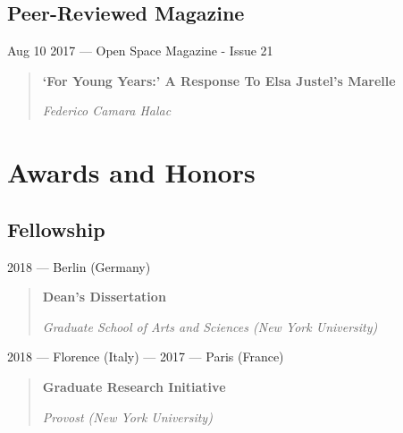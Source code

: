 \documentclass[12pt,overlapped]{res}%
\begin{document}
\begin{resume}
\begin{quote}
\end{quote}%
%
%
%

%
%
%
\subsection{Peer-Reviewed Magazine}%
Aug 10 2017 --- Open Space Magazine - Issue 21 %
\begin{quote}
\par
\textbf{`For Young Years:' A Response To Elsa Justel's Marelle}
\par
\textit{Federico Camara Halac}

\end{quote}%
%
%
%
\section{Awards and Honors}%
%
%
%
\subsection{Fellowship}%
2018 --- Berlin (Germany)%
\begin{quote}
\par
\textbf{Dean's Dissertation}
\par
\textit{Graduate School of Arts and Sciences (New York University)}

\end{quote}%
%
%
%
2018 --- Florence (Italy) --- 2017 --- Paris (France)%
\begin{quote}
\par
\textbf{Graduate Research Initiative}
\par
\textit{Provost (New York University)}


\end{quote}
\end{resume}
\end{document}
